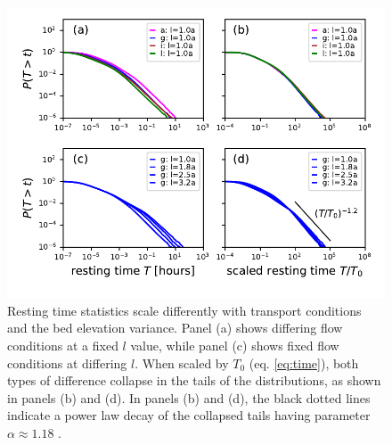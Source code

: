 \begin{figure}[!htbp]
	\includegraphics[width=\linewidth,keepaspectratio]{./figures/ch3/rtcdf.pdf}
	\caption{Resting time statistics scale differently with transport conditions and the bed elevation variance. Panel (a) shows differing flow conditions at a fixed $l$ value, while panel (c) shows fixed flow conditions at differing $l$. When scaled by $T_0$ (eq. \ref{eq:time}), both types of difference collapse in the tails of the distributions, as shown in panels (b) and (d). In panels (b) and (d), the black dotted lines indicate a power law decay of the collapsed tails having parameter $\alpha\approx1.18$ .}
	\label{fig:cdfs}
\end{figure}

